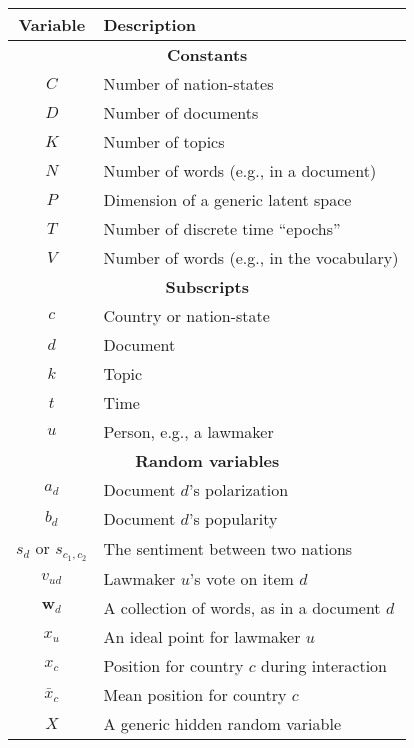 \vspace{-40pt}
\begin{figure*}
    \begin{tabular}{|c|l|}
      \hline
      \textbf{Variable} & \textbf{Description} \\
      \hline
      \multicolumn{2}{|c|}{\textbf{Constants}} \\
      \hline
      $C$ & Number of nation-states \\
      $D$ & Number of documents \\
      $K$ & Number of topics \\
      $N$ & Number of words (e.g., in a document) \\
      $P$ & Dimension of a generic latent space \\
      $T$ & Number of discrete time ``epochs'' \\
      $V$ & Number of words (e.g., in the vocabulary) \\
      \hline
      \multicolumn{2}{|c|}{\textbf{Subscripts}} \\
      \hline
      $c$ & Country or nation-state \\
      $d$ & Document \\
      $k$ & Topic \\
      $t$ & Time \\
      $u$ & Person, e.g., a lawmaker \\
      \hline
      \multicolumn{2}{|c|}{\textbf{Random variables}} \\
      \hline
      $a_d$ & Document $d$'s polarization \\
      $b_d$ & Document $d$'s popularity \\
      $s_d$ or $s_{c_1, c_2}$ & The sentiment between two nations \\
      $v_{ud}$ & Lawmaker $u$'s vote on item $d$ \\
      $\bm w_d$ & A collection of words, as in a document $d$ \\
      $x_u$ & An ideal point for lawmaker $u$ \\
      $x_c$ & Position for country $c$ during interaction \\
      $\bar x_c$ & Mean position for country $c$ \\
      $X$ & A generic hidden random variable \\

\end{tabular}
\end{figure*}
